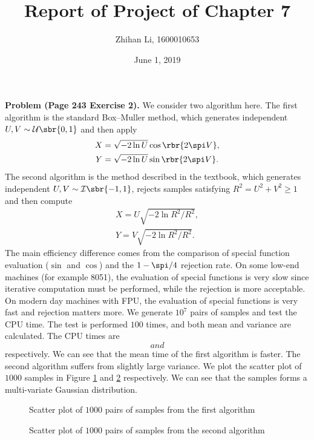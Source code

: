 \documentclass[english, nochinese]{pnote}
\title{Report of Project of Chapter 7}
\author{Zhihan Li, 1600010653}
\date{June 1, 2019}
\begin{document}
\maketitle

\textbf{Problem (Page 243 Exercise 2).} We consider two algorithm here. The first algorithm is the standard Box--Muller method, which generates independent $ U, V \sim \mathcal{U} \sbr{ 0, 1 } $ and then apply
\begin{gather}
X = \sqrt{ -2 \ln U } \cos \rbr{ 2 \spi V }, \\
Y = \sqrt{ -2 \ln U } \sin \rbr{ 2 \spi V }.
\end{gather}
The second algorithm is the method described in the textbook, which generates independent $ U, V \sim \mathcal{I} \sbr{ -1, 1 } $, rejects samples satisfying $ R^2 = U^2 + V^2 \ge 1 $ and then compute
\begin{gather}
X = U \sqrt{ -2 \ln R^2 / R^2 }, \\
Y = V \sqrt{ -2 \ln R^2 / R^2 }.
\end{gather}
The main efficiency difference comes from the comparison of special function evaluation ($\sin$ and $\cos$) and the $ 1 - \spi / 4 $ rejection rate. On some low-end machines (for example 8051), the evaluation of special functions is very slow since iterative computation must be performed, while the rejection is more acceptable. On modern day machines with FPU, the evaluation of special functions is very fast and rejection matters more. We generate $10^7$ pairs of samples and test the CPU time. The test is performed $100$ times, and both mean and variance are calculated. The CPU times are $$ and $$ respectively. We can see that the mean time of the first algorithm is faster. The second algorithm suffers from slightly large variance. We plot the scatter plot of $1000$ samples in Figure \ref{Fig:Algo1} and \ref{Fig:Algo2} respectively. We can see that the samples forms a multi-variate Gaussian distribution.

\begin{figure}[htbp]
\centering

\caption{Scatter plot of $1000$ pairs of samples from the first algorithm}
\label{Fig:Algo1}
\end{figure}

\begin{figure}[htbp]
\centering

\caption{Scatter plot of $1000$ pairs of samples from the second algorithm}
\label{Fig:Algo2}
\end{figure}
\end{document}
